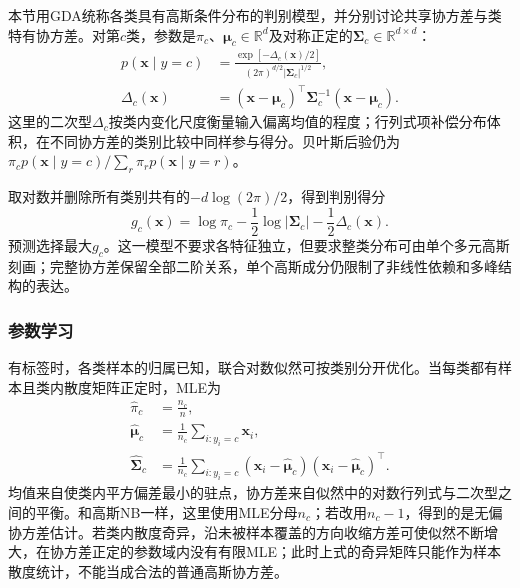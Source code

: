 本节用GDA统称各类具有高斯条件分布的判别模型，并分别讨论共享协方差与类特有协方差。对第$c$类，参数是$\pi_c$、$\bm{\mu}_c\in\mathbb{R}^{d}$及对称正定的$\bm{\Sigma}_c\in\mathbb{R}^{d\times d}$：
\begin{equation}
  \label{eq:classification-gda-density}
  \begin{aligned}
    p(\bm{x}\mid y=c)
      &=\frac{\exp[-\Delta_c(\bm{x})/2]}
        {(2\pi)^{d/2}|\bm{\Sigma}_c|^{1/2}},\\
    \Delta_c(\bm{x})
      &=(\bm{x}-\bm{\mu}_c)^{\top}
        \bm{\Sigma}_c^{-1}(\bm{x}-\bm{\mu}_c).
  \end{aligned}
\end{equation}
这里的二次型$\Delta_c$按类内变化尺度衡量输入偏离均值的程度；行列式项补偿分布体积，在不同协方差的类别比较中同样参与得分。贝叶斯后验仍为$\pi_cp(\bm{x}\mid y=c)/\sum_r\pi_rp(\bm{x}\mid y=r)$。

取对数并删除所有类别共有的$-d\log(2\pi)/2$，得到判别得分
\begin{equation}
  \label{eq:classification-gda-score}
  g_c(\bm{x})
  =\log\pi_c-\frac12\log|\bm{\Sigma}_c|
   -\frac12\Delta_c(\bm{x}).
\end{equation}
预测选择最大$g_c$。这一模型不要求各特征独立，但要求整类分布可由单个多元高斯刻画；完整协方差保留全部二阶关系，单个高斯成分仍限制了非线性依赖和多峰结构的表达。

\subsubsection{参数学习}
\label{sec:classification-gda-learning}

有标签时，各类样本的归属已知，联合对数似然可按类别分开优化。当每类都有样本且类内散度矩阵正定时，MLE为
\begin{equation}
  \label{eq:classification-gda-estimates}
  \begin{aligned}
    \hat\pi_c&=\frac{n_c}{n},\\
    \hat{\bm{\mu}}_c
      &=\frac{1}{n_c}\sum_{i:y_i=c}\bm{x}_i,\\
    \hat{\bm{\Sigma}}_c
      &=\frac{1}{n_c}\sum_{i:y_i=c}
        (\bm{x}_i-\hat{\bm{\mu}}_c)
        (\bm{x}_i-\hat{\bm{\mu}}_c)^{\top}.
  \end{aligned}
\end{equation}
均值来自使类内平方偏差最小的驻点，协方差来自似然中的对数行列式与二次型之间的平衡。和高斯NB一样，这里使用MLE分母$n_c$；若改用$n_c-1$，得到的是无偏协方差估计。若类内散度奇异，沿未被样本覆盖的方向收缩方差可使似然不断增大，在协方差正定的参数域内没有有限MLE；此时上式的奇异矩阵只能作为样本散度统计，不能当成合法的普通高斯协方差。

